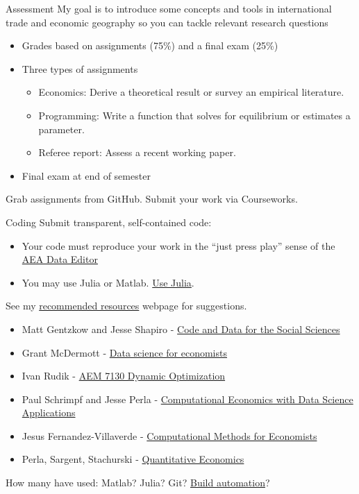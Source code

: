 \documentclass[10pt,notes=hide,aspectratio=169]{beamer}
\begin{document}
\begin{frame}{Assessment}
My goal is to introduce some concepts and tools in international trade and economic geography so you can tackle relevant research questions
\begin{itemize}
\item Grades based on assignments (75\%) and a final exam (25\%)
\item Three types of assignments
\begin{itemize}
\item Economics: Derive a theoretical result or survey an empirical literature.
\item Programming: Write a function that solves for equilibrium or estimates a parameter.
\item Referee report: Assess a recent working paper.
\end{itemize}
\item Final exam at end of semester
\end{itemize}
Grab assignments from GitHub.
Submit your work via Courseworks.
\end{frame}
\begin{frame}{Coding}
Submit transparent, self-contained code:
\begin{itemize}
\item Your code must reproduce your work in the ``just press play'' sense of the \href{https://www.aeaweb.org/journals/data/faq\#run}{AEA Data Editor}
\item You may use Julia or Matlab. \href{https://tradediversion.net/2018/09/17/why-i-encourage-econ-phd-students-to-learn-julia/}{Use Julia}.
\end{itemize}
See my \href{http://www.jdingel.com/teaching/advice.html}{recommended resources} webpage for suggestions.
\begin{itemize}
\item Matt Gentzkow and Jesse Shapiro - \href{https://web.stanford.edu/~gentzkow/research/CodeAndData.pdf}{Code and Data for the Social Sciences}
\item Grant McDermott - \href{https://github.com/uo-ec607/lectures}{Data science for economists}
\item Ivan Rudik - \href{https://github.com/AEM7130/class-repo}{AEM 7130 Dynamic Optimization}
\item Paul Schrimpf and Jesse Perla - \href{https://github.com/ubcecon/ECON622/}{Computational Economics with Data Science Applications}
\item Jesus Fernandez-Villaverde - \href{https://www.sas.upenn.edu/~jesusfv/teaching.html}{Computational Methods for Economists}
\item Perla, Sargent, Stachurski - \href{https://julia.quantecon.org/intro.html}{Quantitative Economics}
\end{itemize}
How many have used: Matlab? Julia? Git? \href{https://tradediversion.net/2019/11/06/why-your-research-project-needs-build-automation/}{Build automation}?
\end{frame}
\end{document}
